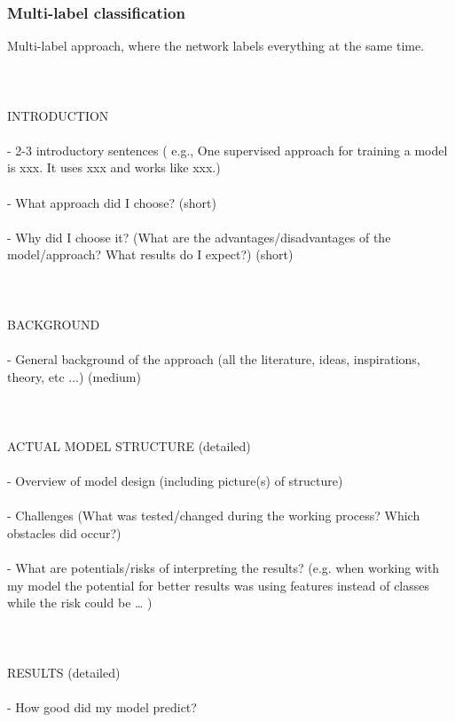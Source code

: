 \subsubsection{Multi-label classification}

Multi-label approach, where the network labels everything at the same time. \\
\\
\\
\\
INTRODUCTION \\
\\ 
- 2-3 introductory sentences ( e.g., One supervised approach for training a model is xxx. It uses xxx and works like xxx.) \\
\\
- What approach did I choose? (short) \\
\\
- Why did I choose it? (What are the advantages/disadvantages of the model/approach? What results do I expect?) (short) \\
\\
\\
\\
BACKGROUND \\
\\
- General background of the approach (all the literature, ideas, inspirations, theory, etc ...) (medium) \\
\\
\\
\\
ACTUAL MODEL STRUCTURE (detailed) \\
\\
- Overview of model design (including picture(s) of structure) \\
\\
- Challenges (What was tested/changed during the working process? Which obstacles did occur?) \\
\\
- What are potentials/risks of interpreting the results? (e.g. when working with my model the potential for better results was using features instead of classes while the risk could be … ) \\
\\
\\
\\
RESULTS (detailed) \\
\\
- How good did my model predict? \\
\\
